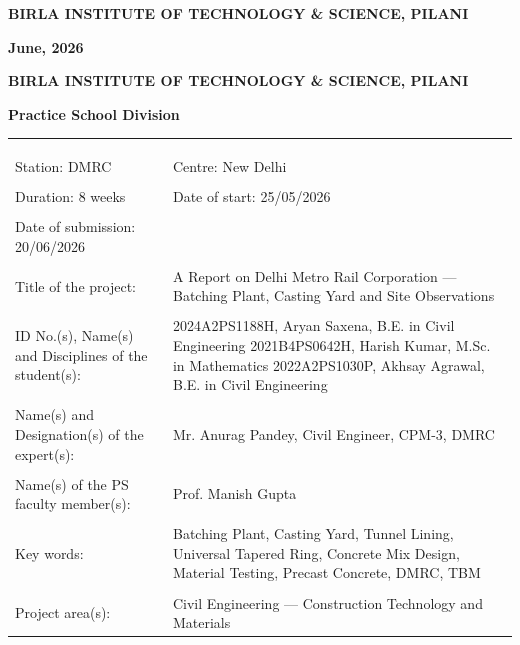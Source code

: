 \documentclass{book}
\begin{document}
	\centerline{\bf BIRLA INSTITUTE OF TECHNOLOGY \& SCIENCE, PILANI}
	\vspace*{0.5cm}
	\centerline{\bf June, 2026}
	\newpage

\thispagestyle{empty}

	\centerline{\bf BIRLA INSTITUTE OF TECHNOLOGY \& SCIENCE, PILANI}
	\vspace*{0.2cm}
	\centerline{\bf Practice School Division}
	\vspace*{0.3cm}
	{\bf 
	\begin{tabular}{p{7cm}p{6cm}}
		& \\
		& \\
		& \\
		Station: DMRC & Centre: New Delhi \\
		& \\
		Duration: 8 weeks & Date of start: 25/05/2026 \\
		& \\
		Date of submission: 20/06/2026 & \\
		& \\
		Title of the project: & A Report on Delhi Metro Rail Corporation --- Batching Plant, Casting Yard and Site Observations \\
		& \\
		ID No.(s), Name(s) and Disciplines of the student(s): &
		2024A2PS1188H, Aryan Saxena, B.E. in Civil Engineering \newline
		2021B4PS0642H, Harish Kumar, M.Sc. in Mathematics \newline
		2022A2PS1030P, Akhsay Agrawal, B.E. in Civil Engineering \\
		& \\
		Name(s) and Designation(s) of the expert(s): & Mr. Anurag Pandey, Civil Engineer, CPM-3, DMRC \\
		& \\
		Name(s) of the PS faculty member(s): & Prof. Manish Gupta \\
		& \\
		Key words: & Batching Plant, Casting Yard, Tunnel Lining, Universal Tapered Ring, Concrete Mix Design, Material Testing, Precast Concrete, DMRC, TBM \\
		& \\
		Project area(s): & Civil Engineering --- Construction Technology and Materials \\
	\end{tabular}}

\newpage
\end{document}
